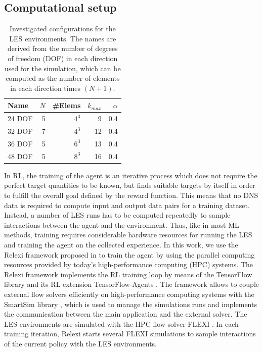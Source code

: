 \subsection{Computational setup}
\label{sec:relexi}


\begin{table}[htb]
  \centering
  \begin{tabular}{lrrrr}
    \toprule
    Name   & $N$ & \#Elems & $k_{max}$ & $\alpha$ \\
    \midrule
    24 DOF &   5 &   $4^3$ &         9 &      0.4 \\
    32 DOF &   7 &   $4^3$ &        12 &      0.4 \\
    36 DOF &   5 &   $6^3$ &        13 &      0.4 \\
    48 DOF &   5 &   $8^3$ &        16 &      0.4 \\
    \bottomrule
  \end{tabular}
  \caption{Investigated configurations for the LES environments. The names are derived from the number of degrees of freedom (DOF) in each direction used for the simulation, which can be computed as the number of elements in each direction times $(N+1)$.}
  \label{tab:les_configs}
\end{table}

In RL, the training of the agent is an iterative process which does not require the perfect target quantities to be known, but finds suitable targets by itself in order to fulfill the overall goal defined by the reward function.
This means that no DNS data is required to compute input and output data pairs for a training dataset.
Instead, a number of LES runs has to be computed repeatedly to sample interactions between the agent and the environment.
Thus, like in most ML methods, training requires considerable hardware resources for running the LES and training the agent on the collected experience.
In this work, we use the Relexi framework proposed in \cite{kurz2022deep,kurz2022relexi} to train the agent by using the parallel computing resources provided by today's high-performance computing (HPC) systems.
The Relexi framework implements the RL training loop by means of the TensorFlow library \cite{abadi2016tensorflow} and its RL extension TensorFlow-Agents \cite{TFAgents}.
The framework allows to couple external flow solvers efficiently on high-performance computing systems with the SmartSim library \cite{partee2021using}, which is used to manage the simulations runs and implements the communication between the main application and the external solver.
The LES environments are simulated with the HPC flow solver FLEXI \cite{krais2021flexi}.
In each training iteration, Relexi starts several FLEXI simulations to sample interactions of the current policy with the LES environments.

